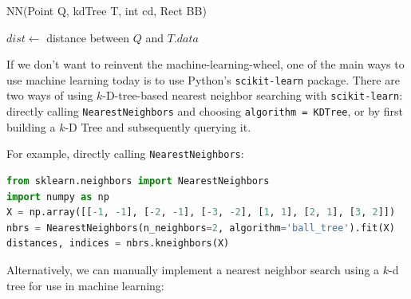 \documentclass{article}
\begin{document}
            \begin{function}
                \caption{NN(Point Q, kdTree T, int cd, Rect BB)}
                \DontPrintSemicolon

                \KwOut{}


                $dist \gets$ distance between $Q$ and $T.data$\;

            \end{function}

            If we don't want to reinvent the machine-learning-wheel, one of the main ways to use machine learning today is to use Python's \texttt{scikit-learn} package.  There are two ways of using $k$-D-tree-based nearest neighbor searching with \texttt{scikit-learn}\cite{sklearn_api}: directly calling \texttt{NearestNeighbors} and choosing \texttt{algorithm = KDTree}, or by first building a $k$-D Tree and subsequently querying it.

            For example, directly calling \texttt{NearestNeighbors}: 

            \begin{lstlisting}[language = Python, caption = \texttt{NearestNeighbors}]
from sklearn.neighbors import NearestNeighbors
import numpy as np
X = np.array([[-1, -1], [-2, -1], [-3, -2], [1, 1], [2, 1], [3, 2]])
nbrs = NearestNeighbors(n_neighbors=2, algorithm='ball_tree').fit(X)
distances, indices = nbrs.kneighbors(X)
            \end{lstlisting}

            Alternatively, we can manually implement a nearest neighbor search using a $k$-d tree for use in machine learning:
\end{document}
